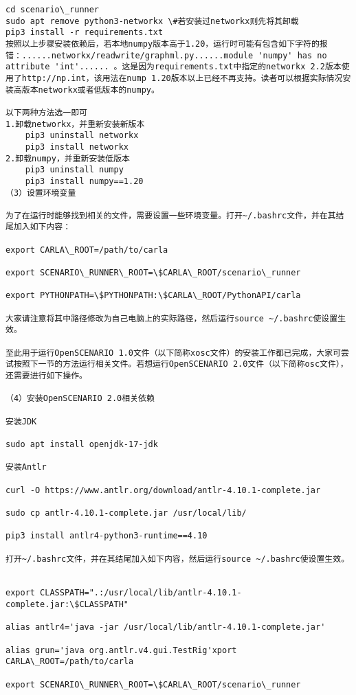 \begin{lstlisting}
cd scenario\_runner
sudo apt remove python3-networkx \#若安装过networkx则先将其卸载
pip3 install -r requirements.txt
按照以上步骤安装依赖后，若本地numpy版本高于1.20，运行时可能有包含如下字符的报错：......networkx/readwrite/graphml.py......module 'numpy' has no attribute 'int'...... 。这是因为requirements.txt中指定的networkx 2.2版本使用了http://np.int，该用法在nump 1.20版本以上已经不再支持。读者可以根据实际情况安装高版本networkx或者低版本的numpy。
		
以下两种方法选一即可
1.卸载networkx，并重新安装新版本
	pip3 uninstall networkx
    pip3 install networkx
2.卸载numpy，并重新安装低版本
	pip3 uninstall numpy
	pip3 install numpy==1.20
（3）设置环境变量
		
为了在运行时能够找到相关的文件，需要设置一些环境变量。打开~/.bashrc文件，并在其结尾加入如下内容：
		
export CARLA\_ROOT=/path/to/carla
		
export SCENARIO\_RUNNER\_ROOT=\$CARLA\_ROOT/scenario\_runner
		
export PYTHONPATH=\$PYTHONPATH:\$CARLA\_ROOT/PythonAPI/carla
		
大家请注意将其中路径修改为自己电脑上的实际路径，然后运行source ~/.bashrc使设置生效。
		
至此用于运行OpenSCENARIO 1.0文件（以下简称xosc文件）的安装工作都已完成，大家可尝试按照下一节的方法运行相关文件。若想运行OpenSCENARIO 2.0文件（以下简称osc文件），还需要进行如下操作。
		
（4）安装OpenSCENARIO 2.0相关依赖
		
安装JDK
		
sudo apt install openjdk-17-jdk
		
安装Antlr
		
curl -O https://www.antlr.org/download/antlr-4.10.1-complete.jar
		
sudo cp antlr-4.10.1-complete.jar /usr/local/lib/
		
pip3 install antlr4-python3-runtime==4.10
		
打开~/.bashrc文件，并在其结尾加入如下内容，然后运行source ~/.bashrc使设置生效。
		
		
export CLASSPATH=".:/usr/local/lib/antlr-4.10.1-complete.jar:\$CLASSPATH"
		
alias antlr4='java -jar /usr/local/lib/antlr-4.10.1-complete.jar'
		
alias grun='java org.antlr.v4.gui.TestRig'xport CARLA\_ROOT=/path/to/carla
		
export SCENARIO\_RUNNER\_ROOT=\$CARLA\_ROOT/scenario\_runner
		

\end{lstlisting}
